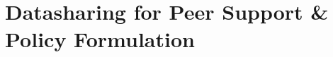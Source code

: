 \documentclass[ twoside,openright,titlepage,numbers=noenddot,headinclude,%
                footinclude=true,cleardoublepage=empty,abstract=false, BCOR=5mm,paper=a4,fontsize=11pt,%
                ngerman,american,%
                ]{scrreprt}
\begin{document}
\part{Datasharing for Peer Support \& Policy Formulation}\label{part3}



\appendix
\cleardoublepage

\cleardoublepage
\cleardoublepage
\cleardoublepage
\end{document}
